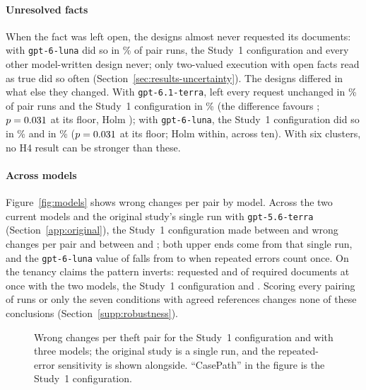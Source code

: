 \paragraph{Unresolved facts}
When the fact was left open, the designs almost never requested its documents:  with \texttt{gpt-6-luna} did so in \thLunaRPremature\% of pair runs, the Study~1 configuration and every other model-written design never; only two-valued execution with open facts read as true did so often (Section~\ref{sec:results-uncertainty}). The designs differed in what else they changed. With \texttt{gpt-6.1-terra},  left every request unchanged in \thTerraRStable\% of pair runs and the Study~1 configuration in \thTerraCPStable\% (the difference favours ; $p=0.031$ at its floor, Holm \ptTerraHFour); with \texttt{gpt-6-luna}, the Study~1 configuration did so in \thLunaCPStable\% and  in \thLunaRStable\% ($p=0.031$ at its floor; Holm \ptLunaHFour{} within, \ptLunaHFourHolmAll{} across ten). With six clusters, no H4 result can be stronger than these.

\paragraph{Across models}
Figure~\ref{fig:models} shows wrong changes per pair by model. Across the two current models and the original study's single run with \texttt{gpt-5.6-terra} (Section~\ref{app:original}), the Study~1 configuration made between \rangeCPWrongPPLo{} and \rangeCPWrongPPHi{} wrong changes per pair and  between \rangeRWrongPPLo{} and \rangeRWrongPPHi; both upper ends come from that single run, and the \texttt{gpt-6-luna} value of  falls from \thLunaRWrongPP{} to \thLunaRDedupWrongPP{} when repeated errors count once. On the tenancy claims the pattern inverts:  requested \pct{\tenTerraBoneRecall} and \pct{\tenLunaBoneRecall} of required documents at once with the two models, the Study~1 configuration \pct{\tenTerraCPxRecall} and \pct{\tenLunaCPxRecall}. Scoring every pairing of runs or only the seven conditions with agreed references changes none of these conclusions (Section~\ref{supp:robustness}).

\begin{figure}[t]
\centering
{}
\caption{Wrong changes per theft pair for the Study~1 configuration and  with three models; the original study is a single run, and the repeated-error sensitivity is shown alongside. ``CasePath'' in the figure is the Study~1 configuration.}
\label{fig:models}\label{fig:theft}
\end{figure}

